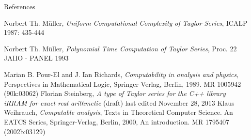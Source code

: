 \documentclass[xcolor=pdftex,dvipsnames,table]{beamer}
\begin{document}
{\begin{frame}{References}
\begin{thebibliography}{10}
  \beamertemplatearticlebibitems
	Norbert Th. M\"{u}ller,
    \newblock \emph{ Uniform Computational Complexity of Taylor Series}, ICALP 1987: 435-444

  \beamertemplatearticlebibitems
	Norbert Th. M\"{u}ller,
    \newblock \emph{ Polynomial Time Computation of Taylor Series}, Proc. 22 JAIIO - PANEL 1993

  \beamertemplatearticlebibitems
	Marian B. Pour-El and J. Ian Richards,
    \newblock \emph{ Computability in analysis
and physics}, Perspectives in Mathematical Logic, Springer-Verlag,
Berlin, 1989. MR 1005942 (90k:03062)
  \beamertemplatearticlebibitems
	Florian Steinberg,
    \newblock \emph{A type of Taylor series for the C++ library iRRAM for exact real arithmetic} (draft) last edited November 28, 2013
  \beamertemplatearticlebibitems
	Klaus Weihrauch,
    \newblock \emph{Computable analysis}, Texts in Theoretical Computer
Science. An EATCS Series, Springer-Verlag, Berlin, 2000, An
introduction. MR 1795407 (2002b:03129)

  \end{thebibliography}

\end{frame}
}
\end{document}

